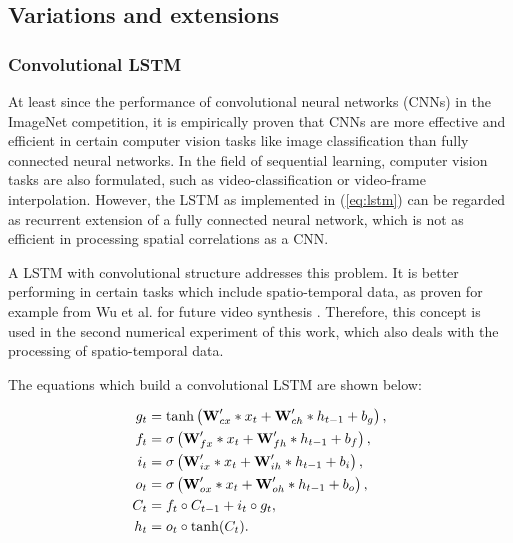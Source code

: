


\subsection{Variations and extensions}\label{cap:variationsextensions}

\subsubsection{Convolutional LSTM}\label{cap:CLSTM}
At least since the performance of convolutional neural networks (CNNs) in the ImageNet competition, it is empirically proven that CNNs are more effective and efficient in certain computer vision tasks like image classification than fully connected neural networks.
In the field of sequential learning, computer vision tasks are also formulated, such as video-classification or video-frame interpolation. However, the LSTM as implemented in (\ref{eq:lstm}) can be regarded as recurrent extension of a fully connected neural network, which is not as efficient in processing spatial correlations as a CNN. 

A LSTM with convolutional structure addresses this problem. It is better performing in certain tasks which include spatio-temporal data, as proven for example from Wu et al. for future video synthesis \cite{wu_future_2020}. Therefore, this concept is used in the second numerical experiment of this work, which also deals with the processing of spatio-temporal data.

The equations which build a convolutional LSTM are shown below:

\begin{align}
    g_t&=\tanh\left(\textbf{W}'_{cx}*x_t + \textbf{W}'_{ch}* h_{t-1} + b_g\right), \notag\\
    f_t&=\sigma\left(\textbf{W}'_{fx}* x_t + \textbf{W}'_{fh}* h_{t-1} + b_f\right), \notag\\
    i_t&=\sigma\left(\textbf{W}'_{ix}* x_t + \textbf{W}'_{ih}* h_{t-1} + b_i\right), \notag\\
    o_t&=\sigma\left(\textbf{W}'_{ox}*x_t + \textbf{W}'_{oh}* h_{t-1} + b_o\right), \notag\\
    C_t&=f_t\circ C_{t-1}+i_t\circ g_t, \notag\\
    h_t&=o_t\circ\tanh(C_t).\notag\\
\end{align}

